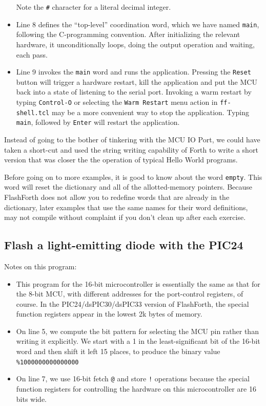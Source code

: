 \documentclass[12pt,a4paper]{article}
\newcommand{\code}[2]{
 \hrulefill
 \scriptsize
 
 \hrulefill
 \vspace{2em}
 \normalsize
}
\begin{document}
\begin{itemize}
  Note the \verb!#! character for a literal decimal integer.
 \item Line 8 defines the ``top-level'' coordination word, which we have named
  \verb!main!, following the C-programming convention.
  After initializing the relevant hardware, it unconditionally loops, doing the output
  operation and waiting, each pass.
 \item Line 9 invokes the \verb!main! word and runs the application.
  Pressing the \verb!Reset! button will trigger a hardware restart,
  kill the application and put the MCU back into a state of listening to the serial port.
  Invoking a warm restart by typing \verb!Control-O! or selecting the \verb!Warm Restart! 
  menu action in \verb!ff-shell.tcl! may be a more convenient way to stop the application.
  Typing \verb!main!, followed by \verb!Enter! will restart the application.
\end{itemize}

\medskip\noindent
Instead of going to the bother of tinkering with the MCU IO Port, 
we could have taken a short-cut and used the string writing capability 
of Forth to write a short version that was closer the the operation of
typical Hello World programs.

\medskip\noindent
\code{}{../src/short-hello-world.txt}

\medskip\noindent
Before going on to more examples, it is good to know about the word \verb!empty!.
This word will reset the dictionary and all of the allotted-memory pointers.
Because FlashForth does not allow you to redefine words that are already in the dictionary,
later examples that use the same names for their word definitions, 
may not compile without complaint if you don't clean up after each exercise.


\bigskip
\subsection{Flash a light-emitting diode with the PIC24}
%

\noindent
\code{}{../pic24/flash-led.txt}

\medskip\noindent
Notes on this program:
\begin{itemize}
\item This program for the 16-bit microcontroller is essentially the same as that
  for the 8-bit MCU, with different addresses for the port-control registers, of course.
  In the PIC24/dsPIC30/dsPIC33 version of FlashForth, the special function registers appear
  in the lowest 2k bytes of memory.
\item On line 5, we compute the bit pattern for selecting the MCU pin rather than writing it explicitly.
  We start with a 1 in the least-significant bit of the 16-bit word and then shift it left 15 places,
  to produce the binary value \verb!%1000000000000000!
\item On line 7, we use 16-bit fetch \verb!@! and store \verb?!? operations because the
  special function registers for controlling the hardware on this microcontroller are 16 bits wide.
\end{itemize}
\end{document}
